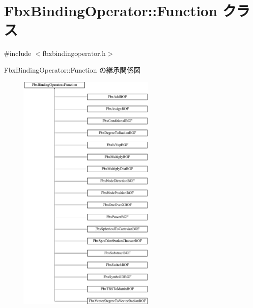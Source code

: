 \hypertarget{class_fbx_binding_operator_1_1_function}{}\section{Fbx\+Binding\+Operator\+:\+:Function クラス}
\label{class_fbx_binding_operator_1_1_function}


{\ttfamily \#include $<$fbxbindingoperator.\+h$>$}

Fbx\+Binding\+Operator\+:\+:Function の継承関係図\begin{figure}[H]
\begin{center}
\leavevmode
\includegraphics[height=12.000000cm]{class_fbx_binding_operator_1_1_function}
\end{center}
\end{figure}
